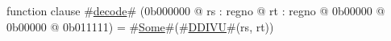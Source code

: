 function clause #\hyperref[zdecode]{decode}# (0b000000 @ rs : regno @ rt : regno @ 0b00000 @ 0b00000 @ 0b011111) =
  #\hyperref[zSome]{Some}#(#\hyperref[zDDIVU]{DDIVU}#(rs, rt))
